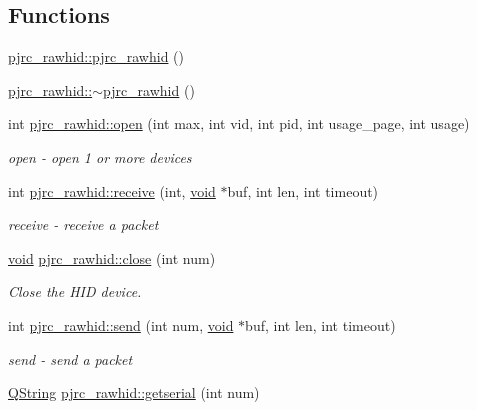 \subsection*{\-Functions}
\begin{DoxyCompactItemize}
\item 
\hyperlink{group___raw_h_i_d_plugin_gac45cb09ef64b6ae7d47e4d8a3a8ffdbe}{pjrc\-\_\-rawhid\-::pjrc\-\_\-rawhid} ()
\item 
\hyperlink{group___raw_h_i_d_plugin_ga2ddf20ce0f573f8fdaae4134abe0c33f}{pjrc\-\_\-rawhid\-::$\sim$pjrc\-\_\-rawhid} ()
\item 
int \hyperlink{group___raw_h_i_d_plugin_ga5ec309dd6bff41a84e52450d10db5fa7}{pjrc\-\_\-rawhid\-::open} (int max, int vid, int pid, int usage\-\_\-page, int usage)
\begin{DoxyCompactList}\small\item\em open -\/ open 1 or more devices \end{DoxyCompactList}\item 
int \hyperlink{group___raw_h_i_d_plugin_gad2cd7d0625e39c7743d3bd814c5829d1}{pjrc\-\_\-rawhid\-::receive} (int, \hyperlink{group___u_a_v_objects_plugin_ga444cf2ff3f0ecbe028adce838d373f5c}{void} $\ast$buf, int len, int timeout)
\begin{DoxyCompactList}\small\item\em receive -\/ receive a packet \end{DoxyCompactList}\item 
\hyperlink{group___u_a_v_objects_plugin_ga444cf2ff3f0ecbe028adce838d373f5c}{void} \hyperlink{group___raw_h_i_d_plugin_gaa8ef1b93b6d941b6213a87ccdcd45d91}{pjrc\-\_\-rawhid\-::close} (int num)
\begin{DoxyCompactList}\small\item\em \-Close the \-H\-I\-D device. \end{DoxyCompactList}\item 
int \hyperlink{group___raw_h_i_d_plugin_gac3f9d785ee170f6331278e39c6f43c00}{pjrc\-\_\-rawhid\-::send} (int num, \hyperlink{group___u_a_v_objects_plugin_ga444cf2ff3f0ecbe028adce838d373f5c}{void} $\ast$buf, int len, int timeout)
\begin{DoxyCompactList}\small\item\em send -\/ send a packet \end{DoxyCompactList}\item 
\hyperlink{group___u_a_v_objects_plugin_gab9d252f49c333c94a72f97ce3105a32d}{\-Q\-String} \hyperlink{group___raw_h_i_d_plugin_gad851d6feef1ebb7256895d5aab3ed3a4}{pjrc\-\_\-rawhid\-::getserial} (int num)

\end{DoxyCompactItemize}
